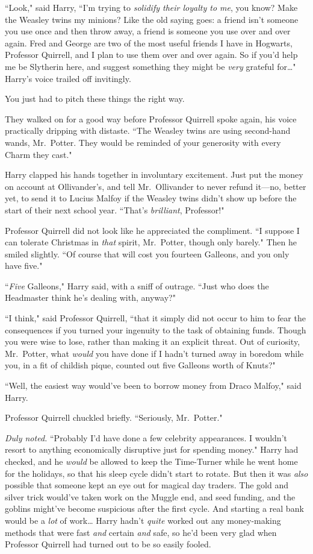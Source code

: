 ``Look," said Harry, ``I'm trying to \emph{solidify their loyalty to me}, you know? Make the Weasley twins my minions? Like the old saying goes: a friend isn't someone you use once and then throw away, a friend is someone you use over and over again. Fred and George are two of the most useful friends I have in Hogwarts, Professor Quirrell, and I plan to use them over and over again. So if you'd help me be Slytherin here, and suggest something they might be \emph{very} grateful for{\ldots}" Harry's voice trailed off invitingly.

You just had to pitch these things the right way.

They walked on for a good way before Professor Quirrell spoke again, his voice practically dripping with distaste. ``The Weasley twins are using second-hand wands, Mr.~Potter. They would be reminded of your generosity with every Charm they cast."

Harry clapped his hands together in involuntary excitement. Just put the money on account at Ollivander's, and tell Mr.~Ollivander to never refund it---no, better yet, to send it to Lucius Malfoy if the Weasley twins didn't show up before the start of their next school year. ``That's \emph{brilliant}, Professor!"

Professor Quirrell did not look like he appreciated the compliment. ``I suppose I can tolerate Christmas in \emph{that} spirit, Mr.~Potter, though only barely." Then he smiled slightly. ``Of course that will cost you fourteen Galleons, and you only have five."

``\emph{Five} Galleons," Harry said, with a sniff of outrage. ``Just who does the Headmaster think he's dealing with, anyway?"

``I think," said Professor Quirrell, ``that it simply did not occur to him to fear the consequences if you turned your ingenuity to the task of obtaining funds. Though you were wise to lose, rather than making it an explicit threat. Out of curiosity, Mr.~Potter, what \emph{would} you have done if I hadn't turned away in boredom while you, in a fit of childish pique, counted out five Galleons worth of Knuts?"

``Well, the easiest way would've been to borrow money from Draco Malfoy," said Harry.

Professor Quirrell chuckled briefly. ``Seriously, Mr.~Potter."

\emph{Duly noted.} ``Probably I'd have done a few celebrity appearances. I wouldn't resort to anything economically disruptive just for spending money." Harry had checked, and he \emph{would} be allowed to keep the Time-Turner while he went home for the holidays, so that his sleep cycle didn't start to rotate. But then it was \emph{also} possible that someone kept an eye out for magical day traders. The gold and silver trick would've taken work on the Muggle end, and seed funding, and the goblins might've become suspicious after the first cycle. And starting a real bank would be a \emph{lot} of work{\ldots} Harry hadn't \emph{quite} worked out any money-making methods that were fast \emph{and} certain \emph{and} safe, so he'd been very glad when Professor Quirrell had turned out to be so easily fooled.


